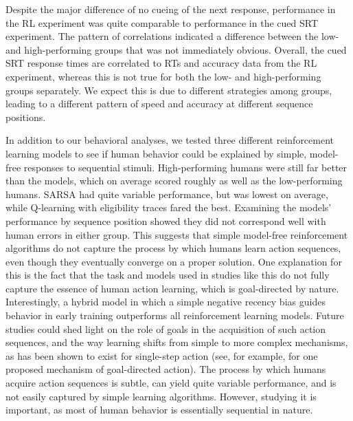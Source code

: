 \documentclass[man,floatsintext]{apa6}
\begin{document}
Despite the major difference of no cueing of the next response, performance in the RL experiment was quite comparable to performance in the cued SRT experiment. The pattern of correlations indicated a difference between the low- and high-performing groups that was not immediately obvious. Overall, the cued SRT response times are correlated to RTs and accuracy data from the RL experiment, whereas this is not true for both the low- and high-performing groups separately. We expect this is due to different strategies among groups, leading to a different pattern of speed and accuracy at different sequence positions. 

In addition to our behavioral analyses, we tested three different reinforcement learning models to see if human behavior could be explained by simple, model-free responses to sequential stimuli. High-performing humans were still far better than the models, which on average scored roughly as well as the low-performing humans. SARSA had quite variable performance, but was lowest on average, while Q-learning with eligibility traces fared the best. Examining the models' performance by sequence position showed they did not correspond well with human errors in either group. This suggests that simple model-free reinforcement algorithms do not capture the process by which humans learn action sequences, even though they eventually converge on a proper solution. One explanation for this is the fact that the task and models used in studies like this do not fully capture the essence of human action learning, which is goal-directed by nature. Interestingly, a hybrid model in which a simple negative recency bias guides behavior in early training outperforms all reinforcement learning models. Future studies could shed light on the role of goals in the acquisition of such action sequences, and the way learning shifts from simple to more complex mechanisms, as has been shown to exist for single-step action (see, for example,  for one proposed mechanism of goal-directed action).  The process by which humans acquire action sequences is subtle, can yield quite variable performance, and is not easily captured by simple learning algorithms. However, studying it is important, as most of human behavior is essentially sequential in nature.





\end{document}
